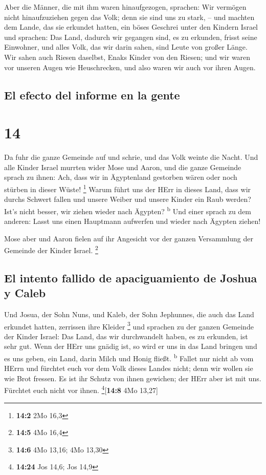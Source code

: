  Aber die Männer, die mit ihm waren hinaufgezogen,
sprachen: Wir vermögen nicht hinaufzuziehen gegen das Volk; denn sie
sind uns zu stark, --  und machten dem Lande, das sie
erkundet hatten, ein böses Geschrei unter den Kindern Israel und
sprachen: Das Land, dadurch wir gegangen sind, es zu erkunden, frisst
seine Einwohner, und alles Volk, das wir darin sahen, sind Leute von
großer Länge.  Wir sahen auch Riesen daselbst, Enaks
Kinder von den Riesen; und wir waren vor unseren Augen wie Heuschrecken,
und also waren wir auch vor ihren Augen.

\hypertarget{el-efecto-del-informe-en-la-gente}{%
\subsection{El efecto del informe en la
gente}\label{el-efecto-del-informe-en-la-gente}}

\hypertarget{section-13}{%
\section{14}\label{section-13}}

 Da fuhr die ganze Gemeinde auf und schrie, und das Volk
weinte die Nacht.  Und alle Kinder Israel murrten wider
Mose und Aaron, und die ganze Gemeinde sprach zu ihnen: Ach, dass wir in
Ägyptenland gestorben wären oder noch stürben in dieser Wüste!
\footnote{\textbf{14:2} 2Mo 16,3}  Warum führt uns der
HErr in dieses Land, dass wir durchs Schwert fallen und unsere Weiber
und unsere Kinder ein Raub werden? Ist's nicht besser, wir ziehen wieder
nach Ägypten? \textsuperscript{b}  Und einer sprach zu dem
anderen: Lasst uns einen Hauptmann aufwerfen und wieder nach Ägypten
ziehen!

 Mose aber und Aaron fielen auf ihr Angesicht vor der
ganzen Versammlung der Gemeinde der Kinder Israel. \footnote{\textbf{14:5}
  4Mo 16,4}

\hypertarget{el-intento-fallido-de-apaciguamiento-de-joshua-y-caleb}{%
\subsection{El intento fallido de apaciguamiento de Joshua y
Caleb}\label{el-intento-fallido-de-apaciguamiento-de-joshua-y-caleb}}

 Und Josua, der Sohn Nuns, und Kaleb, der Sohn Jephunnes,
die auch das Land erkundet hatten, zerrissen ihre Kleider \footnote{\textbf{14:6}
  4Mo 13,16; 4Mo 13,30}  und sprachen zu der ganzen
Gemeinde der Kinder Israel: Das Land, das wir durchwandelt haben, es zu
erkunden, ist sehr gut.  Wenn der HErr uns gnädig ist, so
wird er uns in das Land bringen und es uns geben, ein Land, darin Milch
und Honig fließt. \textsuperscript{b}  Fallet nur nicht ab
vom HErrn und fürchtet euch vor dem Volk dieses Landes nicht; denn wir
wollen sie wie Brot fressen. Es ist ihr Schutz von ihnen gewichen; der
HErr aber ist mit uns. Fürchtet euch nicht vor ihnen.
\footnote{\textbf{14:24} Jos 14,6; Jos 14,9}{[}\textbf{14:8} 4Mo
13,27{]}

